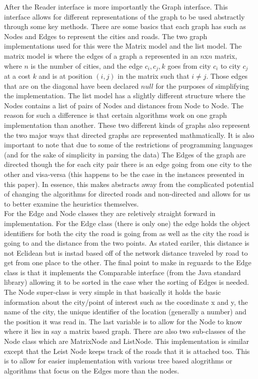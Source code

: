 \documentclass[midd]{thesis}
\newcommand{\tab}{\hspace*{2em}}
\begin{document}
\tab After the Reader  interface is more importantly the Graph interface. This interface allows for different representations of the graph to be used abstractly through some key methods. There are some basics that each graph has such as Nodes and Edges to represent the cities and roads. The two graph implementations used for this were the Matrix model and the list model. The matrix model is where the edges of a graph a represented in an $n$x$n$ matrix, where $n$ is the number of cities, and the edge $c_i,c_j,k$ goes from city $c_i$ to city $c_j$ at a cost $k$ and is at position $(i,j)$ in the matrix such that $i \neq j$. Those edges that are on the diagonal have been declared $null$ for the purposes of simplifying the implementation. The list model has a slightly different structure where the Nodes contains a list of pairs of Nodes and distances from Node to Node. The reason for such a difference is that certain algorithms work on one graph implementation than another. These two different kinds of graphs also represent the two major ways that directed graphs are represented mathmatically. It is also important to note that due to some of the restrictions of programming languages (and for the sake of simplicity in parsing the data) The Edges of the graph are directed though the for each city pair there is an edge going from one city to the other and visa-versa (this happens to be the case in the instances presented in this paper). In essence, this makes abstracts away from the complicated potential of changing the algorithms for directed roads and non-directed and allows for us to better examine the heuristics themselves.\\
\tab For the Edge and Node classes they are reletively straight forward in implementation. For the Edge class (there is only one) the edge holds the object identifiers for both the city the road is going from as well as the city the road is going to and the distance from the two points. As stated eariler, this distance is not Eclidean but is instad based off of the network distance traveled by road to get from one place to the other. The final point to make in reguards to the Edge class is that it implements the Comparable interface (from the Java standard library) allowing it to be sorted in the case wher the sorting of Edges is needed. The Node super-class is very simple in that basically it holds the basic information about the city/point of interest such as the coordinate x and y, the name of the city, the unique identifier of the location (generally a number) and the position it was read in. The last variable is to allow for the Node to know where it lies in say a matrix based graph. There are also two sub-classes of the Node class which are MatrixNode and ListNode. This implementation is similar except that the Leist Node keeps track of the roads that it is attached too. This is to allow for easier implementation with various tree based alogrithms or algorithms that focus on the Edges more than the nodes.\\  
\end{document}
